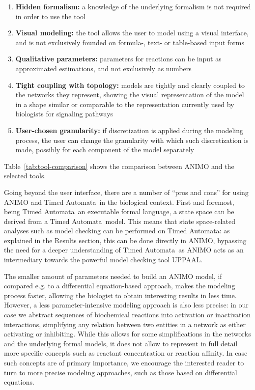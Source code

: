 \documentclass{bmcart}
\def\tas{Timed Automata}
\begin{document}
\begin{enumerate}
  \item {\bf Hidden formalism:} a knowledge of the underlying formalism is not required in order to use the tool
  \item {\bf Visual modeling:} the tool allows the user to model using a visual interface, and is not exclusively
      founded on formula-, text- or table-based input forms
  \item {\bf Qualitative parameters:} parameters for reactions can be input as approximated estimations, and not exclusively as numbers
  \item {\bf Tight coupling with topology:} models are tightly and clearly coupled to the networks they represent, showing the visual
      representation of the model in a shape similar or comparable to the representation currently used by biologists
      for signaling pathways
  \item {\bf User-chosen granularity:} if discretization is applied during the modeling process, the user can change the granularity
      with which such discretization is made, possibly for each component of the model separately
\end{enumerate}
Table~\ref{tab:tool-comparison} shows the comparison between ANIMO and the selected tools.

Going beyond the user interface, there are a number of ``pros and cons'' for using ANIMO and \tas\
in the biological context. First and foremost, being \tas\ an executable formal language,
a state space can be derived from a \tas\ model. This means that state space-related analyses
such as model checking can be performed on \tas: as explained in the Results section, this can
be done directly in ANIMO, bypassing the need for a deeper understanding of \tas\ as
ANIMO acts as an intermediary towards the powerful model checking tool UPPAAL.

The smaller amount of parameters needed to build an ANIMO model, if compared e.g. to
a differential equation-based approach, makes the modeling process faster, allowing
the biologist to obtain interesting results in less time. However, a less
parameter-intensive modeling approach is also less precise: in our case we abstract
sequences of biochemical reactions into activation or inactivation interactions,
simplifying any relation between two entities in a network as either activating or
inhibiting. While this allows for some simplifications in the networks and the underlying
formal models, it does not allow to represent in full detail more specific concepts
such as reactant concentration or reaction affinity. In case such concepts are of
primary importance, we encourage the interested reader to turn to more precise
modeling approaches, such as those based on differential equations.
\end{document}
